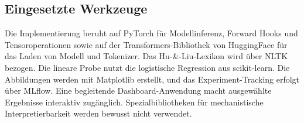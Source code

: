 \subsection{Eingesetzte Werkzeuge}

Die Implementierung beruht auf PyTorch für Modellinferenz, Forward Hooks und Tensoroperationen sowie auf der Transformers-Bibliothek von HuggingFace für das Laden von Modell und Tokenizer. Das Hu-\&-Liu-Lexikon wird über NLTK bezogen. Die lineare Probe nutzt die logistische Regression aus scikit-learn. Die Abbildungen werden mit Matplotlib erstellt, und das Experiment-Tracking erfolgt über MLflow. Eine begleitende Dashboard-Anwendung macht ausgewählte Ergebnisse interaktiv zugänglich. Spezialbibliotheken für mechanistische Interpretierbarkeit werden bewusst nicht verwendet.
